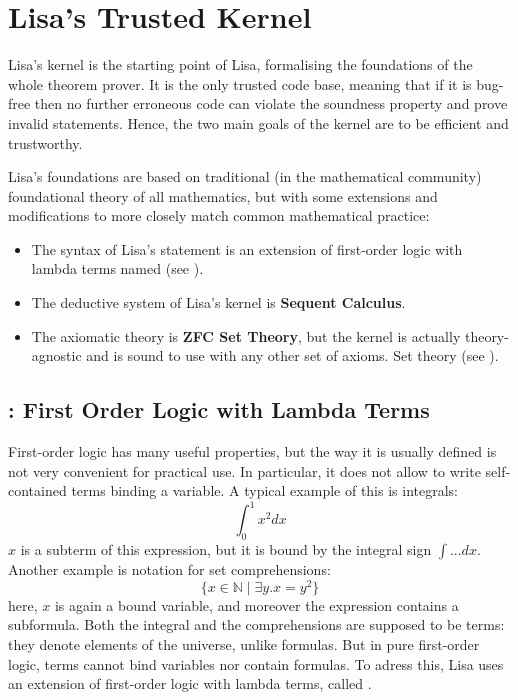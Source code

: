\chapter{Lisa's Trusted Kernel}
\label{chapt:kernel}
Lisa's kernel is the starting point of Lisa, formalising the foundations of the whole theorem prover. It is the only trusted code base, meaning that if it is bug-free then no further erroneous code can violate the soundness property and prove invalid statements. Hence, the two main goals of the kernel are to be efficient and trustworthy.

Lisa's foundations are based on traditional (in the mathematical community) foundational theory of all mathematics, but with some extensions and modifications to more closely match common mathematical practice:
\begin{itemize}
  \item The syntax of Lisa's statement is an extension of first-order logic with lambda terms named \textbf{\lambdafol} (see ).
  \item The deductive system of Lisa's kernel is \textbf{Sequent Calculus}.
  \item The axiomatic theory is \textbf{ZFC Set Theory}, but the kernel is actually theory-agnostic and is sound to use with any other set of axioms. Set theory (see ).
\end{itemize}

\section{\lambdafol: First Order Logic with Lambda Terms}
\label{sec:FOL}

First-order logic has many useful properties, but the way it is usually defined is not very convenient for practical use. In particular, it does not allow to write self-contained terms binding a variable. A typical example of this is integrals:
$$
\int_0^1 x^2 dx
$$
$x$ is a subterm of this expression, but it is bound by the integral sign $\int ... dx$. Another example is notation for set comprehensions:
$$
\lbrace x \in \mathbb N \mid \exists y. x = y^2 \rbrace
$$
here, $x$ is again a bound variable, and moreover the expression contains a subformula. Both the integral and the comprehensions are supposed to be terms: they denote elements of the universe, unlike formulas. But in pure first-order logic, terms cannot bind variables nor contain formulas. To adress this, Lisa uses an extension of first-order logic with lambda terms, called \lambdafol.

